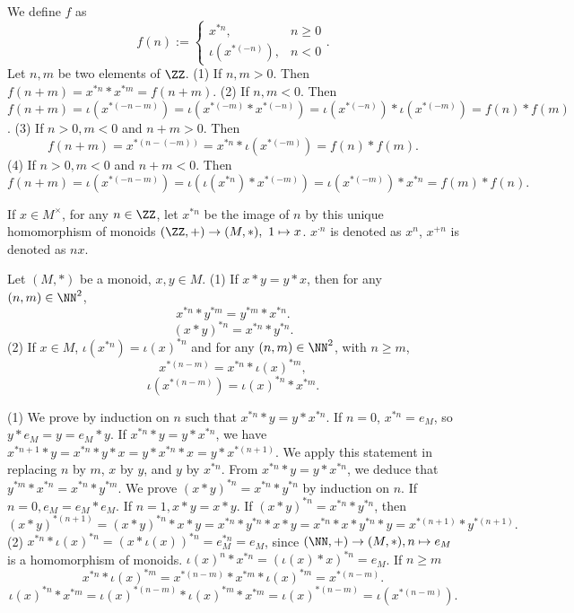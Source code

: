 \begin{proofenv}
    We define $f$ as 
    $$f(n):=\left\{\begin{matrix}
        x^{*n}, &n\ge 0\\
        \iota(x^{*(-n)}), &n<0
    \end{matrix}\right. .$$
    Let $n, m$ be two elements of $\ZZ$.
    \newline
    (1) If $n, m>0$. Then $f(n+m)=x^{*n}*x^{*m}=f(n+m)$.
    \newline
    (2) If $n, m<0$. Then $f(n+m)=\iota(x^{*(-n-m)})=\iota(x^{*(-m)}*x^{*(-n)})=\iota(x^{*(-n)})*\iota(x^{*(-m)})=f(n)*f(m)$.
    \newline
    (3) If $n>0, m<0$ and $n+m>0$. Then $$f(n+m)=x^{*(n-(-m))}=x^{*n}*\iota(x^{*(-m)})=f(n)*f(m).$$
    (4) If $n>0, m<0$ and $n+m<0$. Then $$f(n+m)=\iota(x^{*(-n-m)})=\iota(\iota(x^{*n})*x^{*(-m)})=\iota(x^{*(-m)})*x^{*n}=f(m)*f(n).$$
\end{proofenv}
\begin{notationenv}
    If $x\in M^\times$,  for any $n\in \ZZ$,  let $x^{*n}$ be the image of $n$ by this unique homomorphism of monoids $(\ZZ, +)\rightarrow (M, *), \ 1\mapsto x$. $x^{\cdot n}$ is denoted as $x^n$,  $x^{+n}$ is denoted as $nx$.
\end{notationenv}
\begin{propositionenv}
    Let $(M, *)$ be a monoid,  $x, y\in M$.
    \newline
    (1) If $x*y=y*x$,  then for any $(n, m)\in \NN^2$, 
     $$x^{*n}*y^{*m}=y^{*m}*x^{*n}.$$ 
     $$(x*y)^{*n}=x^{*n}*y^{*n}.$$
    \newline
    (2) If $x\in M$,  $\iota(x^{*n})=\iota(x)^{*n}$ and for any $(n, m)\in \NN^2$,  with $n\ge m$, 
    $$x^{*(n-m)}=x^{*n}*\iota(x)^{*m}, $$
    $$\iota(x^{*(n-m)})=\iota(x)^{*n}*x^{*m}.$$
\end{propositionenv}
\begin{proofenv}
   \quad
   \newline
    (1) We prove by induction on $n$ such that $x^{*n}*y=y*x^{*n}$.
    If $n=0$,  $x^{*n}=e_M$,  so $y*e_M=y=e_M*y$. If $x^{*n}*y=y*x^{*n}$,  we have $x^{*n+1}*y=x^{*n}*y*x=y*x^{*n}*x=y*x^{*(n+1)}$. We apply this  statement in replacing $n$ by $m$,  $x$ by $y$,  and $y$ by $x^{*n}$. From $x^{*n}*y=y*x^{*n}$,  we deduce that $y^{*m}*x^{*n}=x^{*n}*y^{*m}$. We prove $(x*y)^{*n}=x^{*n}*y^{*n}$ by induction on $n$. If $n=0, e_M=e_M*e_M$. If $n=1, x*y=x*y$. If $(x*y)^{*n}=x^{*n}*y^{*n}$,  then $$(x*y)^{*(n+1)}=(x*y)^{*n}*x*y=x^{*n}*y^{*n}*x*y=x^{*n}*x*y^{*n}*y=x^{*(n+1)}*y^{*(n+1)}.$$
    (2) $x^{*n}*\iota(x)^{*n}=(x*\iota(x))^{*n}=e_{M}^{*n} = e_{M}$,  since $(\NN, +)\rightarrow (M, *),  n\mapsto e_M$ is a homomorphism of monoids. $\iota(x)^n* x^{*n} = (\iota(x) * x)^{*n} = e_{M}$. If $n \geq m$ 
$$
x^{*n} * \iota(x)^{*m} = x^{*(n-m)} * x^{*m} * \iota(x)^{*m} = x^{*(n-m)}
.$$
$$
\iota(x)^{*n} * x^{*m} = \iota(x)^{*(n-m)} * \iota(x)^{*m} * x^{*m}=\iota(x)^{*(n-m)}=\iota(x^{*(n-m)})
.$$
\end{proofenv}
